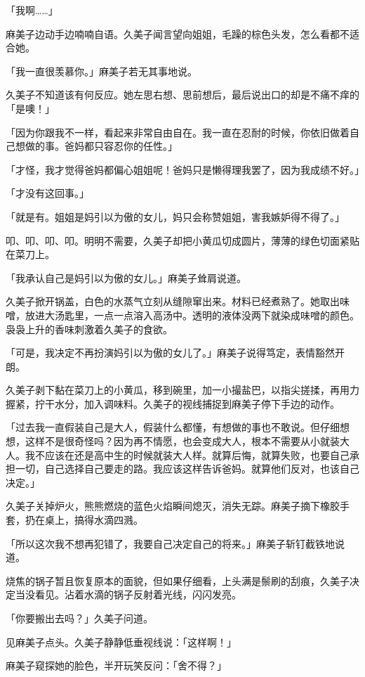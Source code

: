 \documentclass[UTF8]{ctexart}
\begin{document}
    「我啊……」 

    麻美子边动手边喃喃自语。久美子闻言望向姐姐，毛躁的棕色头发，怎么看都不适合她。 

    「我一直很羡慕你。」麻美子若无其事地说。 

    久美子不知道该有何反应。她左思右想、思前想后，最后说出口的却是不痛不痒的「是噢！」 

    「因为你跟我不一样，看起来非常自由自在。我一直在忍耐的时候，你依旧做着自己想做的事。爸妈都只容忍你的任性。」 

    「才怪，我才觉得爸妈都偏心姐姐呢！爸妈只是懒得理我罢了，因为我成绩不好。」 

    「才没有这回事。」 

    「就是有。姐姐是妈引以为傲的女儿，妈只会称赞姐姐，害我嫉妒得不得了。」 

    叩、叩、叩、叩。明明不需要，久美子却把小黄瓜切成圆片，薄薄的绿色切面紧贴在菜刀上。 

    「我承认自己是妈引以为傲的女儿。」麻美子耸肩说道。 

    久美子掀开锅盖，白色的水蒸气立刻从缝隙窜出来。材料已经煮熟了。她取出味噌，放进大汤匙里，一点一点溶入高汤中。透明的液体没两下就染成味噌的颜色。袅袅上升的香味刺激着久美子的食欲。 

    「可是，我决定不再扮演妈引以为傲的女儿了。」麻美子说得笃定，表情豁然开朗。 

    久美子剥下黏在菜刀上的小黄瓜，移到碗里，加一小撮盐巴，以指尖搓揉，再用力握紧，拧干水分，加入调味料。久美子的视线捕捉到麻美子停下手边的动作。 

    「过去我一直假装自己是大人，假装什么都懂，有想做的事也不敢说。但仔细想想，这样不是很奇怪吗？因为再不情愿，也会变成大人，根本不需要从小就装大人。我不应该在还是高中生的时候就装大人样。就算后悔，就算失败，也要自己承担一切，自己选择自己要走的路。我应该这样告诉爸妈。就算他们反对，也该自己决定。」 

    久美子关掉炉火，熊熊燃烧的蓝色火焰瞬间熄灭，消失无踪。麻美子摘下橡胶手套，扔在桌上，搞得水滴四溅。 

    「所以这次我不想再犯错了，我要自己决定自己的将来。」麻美子斩钉截铁地说道。 

    烧焦的锅子暂且恢复原本的面貌，但如果仔细看，上头满是鬃刷的刮痕，久美子决定当没看见。沾着水滴的锅子反射着光线，闪闪发亮。 

    「你要搬出去吗？」久美子问道。 

    见麻美子点头。久美子静静低垂视线说：「这样啊！」 

    麻美子窥探她的脸色，半开玩笑反问：「舍不得？」 
\end{document}
